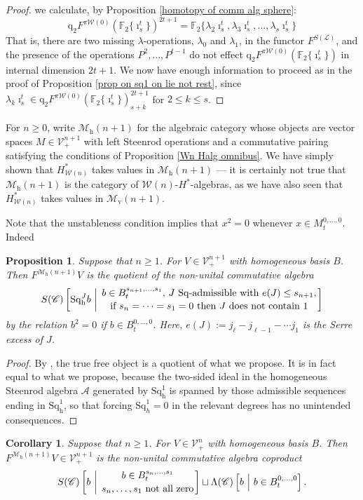 \documentclass[11pt]{amsart} \renewcommand{\baselinestretch}{1.4}
\theoremstyle{plain}
\newtheorem{prop}[thm]{Proposition}
\newtheorem{cor}[thm]{Corollary}
\theoremstyle{definition}
\newcommand{\scrL}{\mathscr{L}}
\newcommand{\scrC}{\mathscr{C}}
\newcommand{\calA}{\mathcal{A}}
\newcommand{\calV}{\mathcal{V}}
\newcommand{\calw}{\mathcal{W}}
\newcommand{\calMv}{\mathcal{M}\dver}
\newcommand{\calMh}{\mathcal{M}\dhor}
\newcommand{\citeBOX}[2][]{\cite[\mbox{#1}]{#2}}
\newcommand{\LieOperad}{{\scrL}}
\newcommand{\CommOperad}{{\scrC}}
\newcommand{\vect}[2]{\calV^{#1}_{#2}}
\newcommand{\PA}[1]{\pi#1}
\newcommand{\quadgrad}[1]{\mathrm{q}_{#1}}
\newcommand{\excess}{e}
\newcommand{\Sq}{\mathrm{Sq}}
\newcommand{\LieSteen}{\calA}
\newcommand{\F}{\mathbb{F}}
\newcommand{\Ftwo}{\F_2}
\newcommand{\dver}{_\mathrm{v}}
\newcommand{\dhor}{_\mathrm{h}}
\newcommand{\Sqh}{\mathrm{Sq}\dhor}
\begin{document}
\begin{Cohomology Operations for W and U}
\begin{proof}
we calculate, by Proposition \ref{homotopy of comm alg sphere}:
\[\quadgrad{2}F^{\PA{\calw(0)}}(\Ftwo\{\imath^t_s\})^{2t+1}=\Ftwo\{\lambda_2\imath^t_s,\lambda_3\imath^t_s,\ldots,\lambda_s\imath^t_s\}\]
 That is, there are two missing $\lambda$-operations, $\lambda_0$ and $\lambda_1$, in the functor $F^{S(\LieOperad)}$, and the presence of the operations $P^2,\ldots,P^{t-1}$ do not effect $\quadgrad{2}F^{\PA{\calw(0)}}(\Ftwo\{\imath^t_s\})$ in internal dimension $2t+1$. We now have enough information to proceed as in the proof of Proposition \ref{prop on sq1 on lie not rest}, since $\lambda_k\imath^t_s\in \quadgrad{2}F^{\PA{\calw(0)}}(\Ftwo\{\imath^t_s\})^{2t+1}_{s+k}$ for $2\leq k\leq s$.
\end{proof}



For $n\geq0$, write $\calMh(n+1)$ for the algebraic category whose objects are vector spaces $M\in\vect{n+1}{+}$ with left Steenrod operations and a commutative pairing satisfying the conditions of Proposition \ref{Wn Halg omnibus}. We have simply shown that $H^*_{\calw(n)}$ takes values in $\calMh(n+1)$ --- it is certainly not true that $\calMh(n+1)$ is the category of $\calw(n)$-$H^*$-algebras, as we have also seen that $H^*_{\calw(n)}$ takes values in $\calMv(n+1)$.

Note that the unstableness condition implies that $x^2=0$ whenever $x\in M_t^{0,\ldots,0}$. Indeed
\begin{prop}
\label{basis of free horizontal operations algebra}
Suppose that $n\geq1$. For $V\in\vect{n+1}{+}$ with homogeneous basis $B$. Then $F^{\calMh(n+1)}V$ is the quotient of the non-unital commutative algebra
\[S(\CommOperad) \left[\Sq\dhor^Jb\ \middle|\ \genfrac{}{}{0pt}{}{b\in B^{s_{n+1},\ldots,s_1}_t\textup{, $J$ $\Sq$-admissible with }\excess(J)\leq s_{n+1},}{\textup{if }s_{n}=\cdots=s_1=0\textup{ then $J$ does not contain 1}}\right]\]
by the relation $b^2=0$ if $b\in B_t^{0,\ldots,0}$. Here, $e(J):=j_\ell-j_{\ell-1}-\cdots j_1$ is the Serre excess of $J$.
\end{prop}
\begin{proof}
By \citeBOX[6.1]{PriddySimplicialLie.pdf}, the true free object is a quotient of what we propose. It is in fact equal to what we propose, because the two-sided ideal in the homogeneous Steenrod algebra $\LieSteen$ generated by $\Sqh^1$ is spanned by those admissible sequences ending in $\Sqh^1$, so that forcing $\Sq^1_h=0$ in the relevant degrees has no unintended consequences. %
\end{proof}
\begin{cor}
\label{basis of free horizontal operations algebra restricted}
Suppose that $n\geq1$. For $V\in\vect{n}{+}$ with homogeneous basis $B$. Then $F^{\calMh(n+1)}V\in\vect{n+1}{+}$ is the non-unital commutative algebra coproduct
\[S(\CommOperad) \left[b\ \middle|\ \genfrac{}{}{0pt}{}{b\in B^{s_{n},\ldots,s_1}_t}{s_{n},\ldots,s_1\textup{ not all zero}}\right]\sqcup\Lambda(\CommOperad) \left[b\ \middle|\ b\in B^{0,\ldots,0}_t\right].\]
\end{cor}

\end{Cohomology Operations for W and U}
\end{document}
